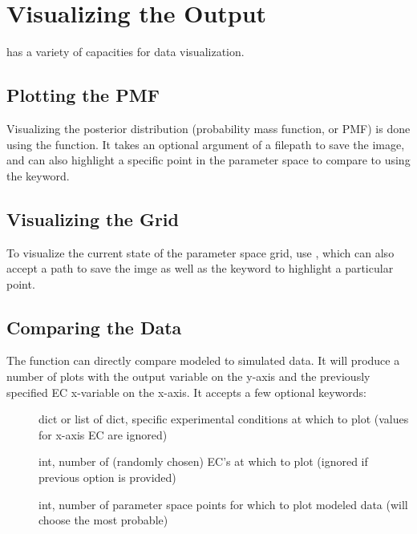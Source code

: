 \documentclass[letterpaper,10pt,english]{sphinxmanual}
\begin{document}
\section{Visualizing the Output}
\label{\detokenize{manual:visualizing-the-output}}
 has a variety of capacities for data visualization.


\subsection{Plotting the PMF}
\label{\detokenize{manual:plotting-the-pmf}}
Visualizing the posterior distribution (probability mass function, or PMF) is done using the  function. It takes an optional argument of a filepath to save the image, and can also highlight a specific point in the parameter space to compare to using the  keyword.


\subsection{Visualizing the Grid}
\label{\detokenize{manual:visualizing-the-grid}}
To visualize the current state of the parameter space grid, use , which can also accept a path to save the imge as well as the  keyword to highlight a particular point.


\subsection{Comparing the Data}
\label{\detokenize{manual:comparing-the-data}}
The  function can directly compare modeled to simulated data. It will produce a number of plots with the output variable on the y-axis and the previously specified EC x-variable on the x-axis. It accepts a few optional keywords:
\begin{description}
\item[{}] \leavevmode
dict or list of dict, specific experimental
conditions at which to plot (values for x-axis EC are ignored)

\item[{}] \leavevmode
int, number of (randomly chosen) EC’s at which to plot
(ignored if previous option is provided)

\item[{}] \leavevmode
int, number of parameter space points for which to plot
modeled data (will choose the most probable)

\end{description}
\end{document}
